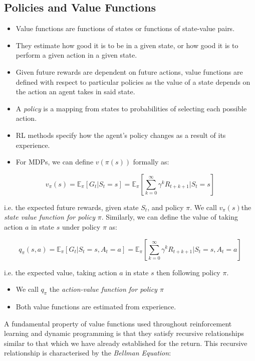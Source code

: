 \subsection{Policies and Value Functions}
\begin{itemize}
\item Value functions are functions of states or functions of state-value pairs.
\item They estimate how good it is to be in a given state, or how good it is to perform a given action in a given state.
\item Given future rewards are dependent on future actions, value functions are defined with respect to particular policies as the value of a state depends on the action an agent takes in said state.
\item A \textit{policy} is a mapping from states to probabilities of selecting each possible action.
\item RL methods specify how the agent's policy changes as a result of its experience.
\item For MDPs, we can define $v(\pi(s))$ formally as:
\end{itemize}

\begin{equation}
v_\pi(s) = \mathbb{E}_\pi \left[G_t | S_t = s \right] = \mathbb{E}_\pi \left[\sum_{k=0}^{\infty} \gamma^k R_{t+k+1} | S_t = s\right]
\end{equation}

i.e. the expected future rewards, given state \(S_t\), and policy \(\pi\). We call \(v_\pi(s)\)the \textit{state value function for policy} $\pi$. Similarly, we can define the value of taking action \(a\) in state \(s\) under policy \(\pi\) as:

\begin{equation}
q_\pi(s,a) = \mathbb{E}_\pi \left[G_t | S_t = s, A_t = a \right] = \mathbb{E}_\pi \left[\sum_{k=0}^{\infty} \gamma^k R_{t+k+1} | S_t = s, A_t = a \right]
\end{equation}

i.e. the expected value, taking action \(a\) in state \(s\) then following policy \(\pi\).
\begin{itemize}
\item We call \(q_\pi\) the \textit{action-value function for policy \(\pi\)}
\item Both value functions are estimated from experience.
\end{itemize}

A fundamental property of value functions used throughout reinforcement learning and dynamic programming is that they satisfy recursive relationships similar to that which we have already established for the return. This recursive relationship is characterised by the \textit{Bellman Equation}:

